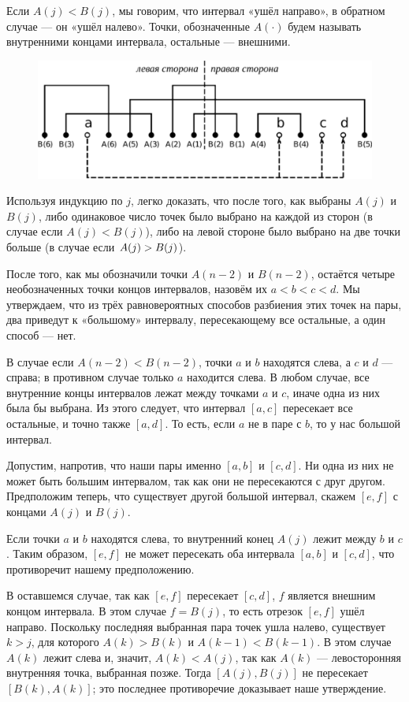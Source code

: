 Если $A(j) < B(j)$, мы говорим, что интервал «ушёл направо», в обратном случае --- он «ушёл налево».
Точки, обозначенные $A({\cdot})$ будем называть внутренними концами интервала, остальные --- внешними.

\begin{figure}[h!]
\centering
\includegraphics[scale=0.55]{Figs/Probability/labeling-ru}
\end{figure} 

Используя индукцию по $j$, легко доказать, что после того, как выбраны $A(j)$ и $B(j)$, либо одинаковое число точек было выбрано на каждой из сторон (в случае если $A(j) < B(j)$), либо на левой стороне было выбрано на две точки больше (в случае если $A(j) \z> B(j)$).

После того, как мы обозначили точки $A(n-2)$ и $B(n-2)$, остаётся четыре необозначенных точки концов интервалов, назовём их $a<b<c< d$.
Мы утверждаем, что из трёх равновероятных способов разбиения этих точек на пары, два приведут к «большому» интервалу, пересекающему все остальные, а один способ --- нет.

В случае если $A(n-2) < B(n-2)$, точки $a$ и $b$ находятся слева, а $c$ и $d$ --- справа;
в противном случае только $a$ находится слева.
В любом случае, все внутренние концы интервалов лежат между точками $a$ и $c$, иначе одна из них была бы выбрана.
Из этого следует, что интервал $[a,c]$ пересекает все остальные, и точно также $[a,d]$.
То есть, если $a$ не в паре с $b$, то у нас большой интервал.

Допустим, напротив, что наши пары именно $[a, b]$ и $[c, d]$.
Ни одна из них не может быть большим интервалом, так как они не пересекаются с друг другом.
Предположим теперь, что существует другой большой интервал, скажем $[e,f]$ с концами $A(j)$ и $B(j)$.

Если точки $a$ и $b$ находятся слева, то внутренний конец $A(j)$ лежит между $b$ и $c$.
Таким образом, $[e, f]$ не может пересекать оба интервала $[a, b]$ и $[c, d]$, что противоречит нашему предположению.

В оставшемся случае, так как $[e, f]$ пересекает $[c, d]$, $f$ является внешним концом интервала. 
В этом случае $f=B(j)$, то есть отрезок $[e, f]$ ушёл направо.
Поскольку последняя выбранная пара точек ушла налево, существует $k>j$, для которого $A(k)>B(k)$ и $A(k-1)<B(k-1)$.
В этом случае $A(k)$ лежит слева и, значит, $A(k) < A(j)$, так как $A(k)$ --- левосторонняя внутренняя точка, выбранная позже.
Тогда $[A(j), B(j)]$ не пересекает $[B(k), A(k)]$; это последнее противоречие доказывает наше утверждение.
\heart

